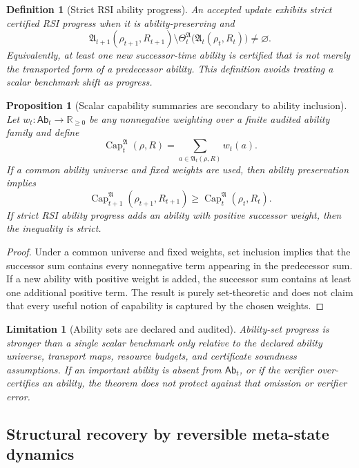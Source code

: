 \documentclass[11pt]{article}
\newtheorem{proposition}[theorem]{Proposition}
\newtheorem{definition}[theorem]{Definition}
\newtheorem{limitation}[theorem]{Limitation}
\newcommand{\1}{\mathbf{1}}
\renewcommand{\Cap}{\operatorname{Cap}}
\begin{document}
\begin{definition}[Strict RSI ability progress]
\label{def:strict_rsi_ability_progress}
An accepted update exhibits strict certified RSI progress when it is ability-preserving and
\[
\mathfrak A_{t+1}(\rho_{t+1},R_{t+1})
\setminus
\Theta_t^{\mathfrak A}\bigl(\mathfrak A_t(\rho_t,R_t)\bigr)
\ne\varnothing.
\]
Equivalently, at least one new successor-time ability is certified that is not merely the transported form of a predecessor ability.  This definition avoids treating a scalar benchmark shift as progress.
\end{definition}

\begin{proposition}[Scalar capability summaries are secondary to ability inclusion]
\label{prop:scalar_capability_secondary}
Let \(w_t:\mathsf{Ab}_t\to\mathbb R_{\ge0}\) be any nonnegative weighting over a finite audited ability family and define
\[
\Cap_t^{\mathfrak A}(\rho,R)=\sum_{a\in\mathfrak A_t(\rho,R)}w_t(a).
\]
If a common ability universe and fixed weights are used, then ability preservation implies
\[
\Cap_{t+1}^{\mathfrak A}(\rho_{t+1},R_{t+1})
\ge
\Cap_t^{\mathfrak A}(\rho_t,R_t).
\]
If strict RSI ability progress adds an ability with positive successor weight, then the inequality is strict.
\end{proposition}

\begin{proof}
Under a common universe and fixed weights, set inclusion implies that the successor sum contains every nonnegative term appearing in the predecessor sum.  If a new ability with positive weight is added, the successor sum contains at least one additional positive term.  The result is purely set-theoretic and does not claim that every useful notion of capability is captured by the chosen weights.
\end{proof}

\begin{limitation}[Ability sets are declared and audited]
Ability-set progress is stronger than a single scalar benchmark only relative to the declared ability universe, transport maps, resource budgets, and certificate soundness assumptions.  If an important ability is absent from \(\mathsf{Ab}_t\), or if the verifier over-certifies an ability, the theorem does not protect against that omission or verifier error.
\end{limitation}

\subsection{Structural recovery by reversible meta-state dynamics}
\end{document}
